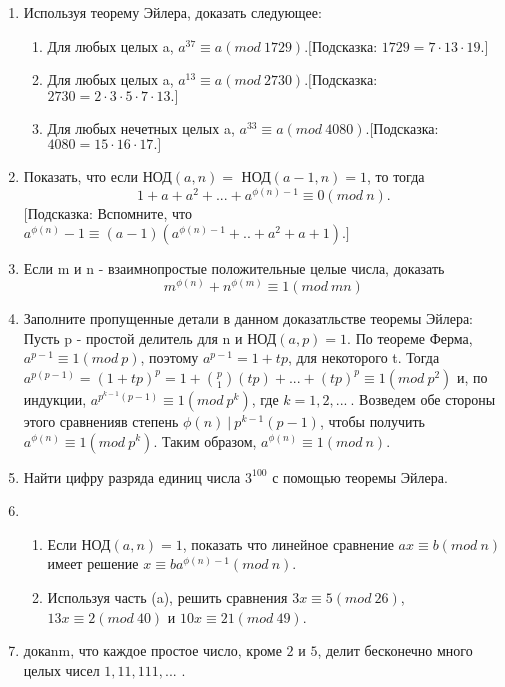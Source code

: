\documentclass[11pt, leqno]{article}
\begin{document}
\begin{enumerate}
	\item Используя теорему Эйлера, доказать следующее:
		\begin{enumerate}
			\item Для любых целых a, $a^{37} \equiv a (mod\ 1729). [$Подсказка: $1729 = 7 \cdot 13 \cdot 19.]$
			\item Для любых целых a, $a^{13} \equiv a (mod\ 2730). [$Подсказка: $2730 = 2 \cdot 3 \cdot 5 \cdot 7 \cdot 13.]$
			\item Для любых нечетных целых a, $a^{33} \equiv a (mod\ 4080). [$Подсказка: $4080 = 15 \cdot 16 \cdot 17.]$
		\end{enumerate}
	\item Показать, что если НОД$(a, n) =$ НОД$(a-1, n) = 1$, то тогда
	$$1 + a + a^2 + ... + a^{\phi(n)-1}  \equiv 0 (mod\ n).$$
	$[$Подсказка: Вспомните, что $a^{\phi(n)} - 1 \equiv (a - 1)(a^{\phi(n) - 1} + .. + a^2 + a + 1). ]$
	\item Если m и n - взаимнопростые положительные целые числа, доказать
	$$m^{\phi(n)} + n^{\phi(m)} \equiv 1 (mod\ mn)$$
	\item Заполните пропущенные детали в данном доказатльстве теоремы Эйлера: Пусть p - простой делитель для n и НОД$(a, p) = 1$. По теореме Ферма, $a^{p - 1} \equiv 1 (mod\ p)$, поэтому $a^{p - 1} = 1 + tp$, для некоторого t. Тогда $a^{p(p - 1)} = (1 + tp)^p = 1 + \binom{p}{1} (tp) + ... + (tp)^p \equiv 1 (mod\ p^2)$ и, по индукции, $a^{p^{k - 1}(p - 1)} \equiv 1 (mod\ p^k)$, где $k = 1, 2, ...\ .$ Возведем обе стороны этого сравненияв степень $\phi(n)\ |\ p^{k - 1}(p - 1)$, чтобы получить $a^{\phi(n)} \equiv 1 (mod\ p^k)$. Таким образом, $a^{\phi(n)} \equiv 1 (mod\ n)$.
	\item Найти цифру разряда единиц числа $3^{100}$ с помощью теоремы Эйлера.
	\item 	\begin{enumerate}
			\item Если НОД$(a, n) = 1$, показать что линейное сравнение $ax \equiv b (mod\ n)$ имеет решение $x \equiv  ba^{\phi(n) - 1} (mod\ n)$.
			\item Используя часть (a), решить сравнения $3x \equiv 5 (mod\ 26)$, $13x \equiv 2 (mod\ 40)$ и $10x \equiv 21 (mod\ 49)$.
			\end{enumerate}
	\item докаnm, что каждое простое число, кроме $2$ и $5$, делит бесконечно много целых чисел $1, 11, 111, ...$ .
\end{enumerate}
\end{document}
